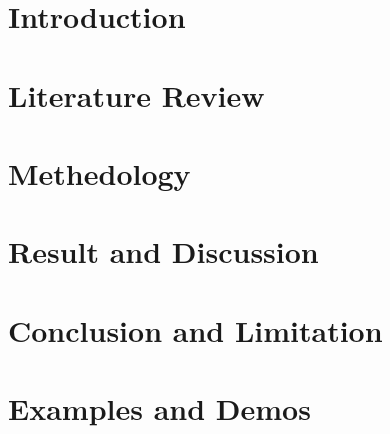 \chapter{Introduction}
\label{introChapter}


\chapter{Literature Review}
\label{literatureReviewChapter}


\chapter{Methedology}
\label{methodologyChapter}


\chapter{Result and Discussion}
\label{resultChapter}


\chapter{Conclusion and Limitation}
\label{conclusionChapter}


\chapter{Examples and Demos}
\label{examplesChapter}

